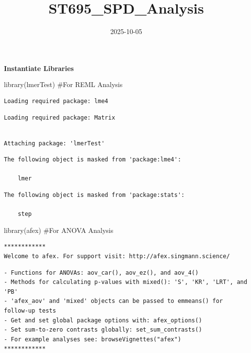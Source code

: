 \documentclass[
  letterpaper,
  DIV=11,
  numbers=noendperiod]{scrartcl}
\title{ST695\_SPD\_Analysis}
\author{}
\date{2025-10-05}
\newenvironment{Shaded}{\begin{snugshade}}{\end{snugshade}}
\newcommand{\CommentTok}[1]{\textcolor[rgb]{0.37,0.37,0.37}{#1}}
\newcommand{\FunctionTok}[1]{\textcolor[rgb]{0.28,0.35,0.67}{#1}}
\newcommand{\NormalTok}[1]{\textcolor[rgb]{0.00,0.23,0.31}{#1}}
\begin{document}
\maketitle


\textbf{Instantiate Libraries}

\begin{Shaded}
\begin{Highlighting}[]
\FunctionTok{library}\NormalTok{(lmerTest) }\CommentTok{\#For REML Analysis}
\end{Highlighting}
\end{Shaded}

\begin{verbatim}
Loading required package: lme4
\end{verbatim}

\begin{verbatim}
Loading required package: Matrix
\end{verbatim}

\begin{verbatim}

Attaching package: 'lmerTest'
\end{verbatim}

\begin{verbatim}
The following object is masked from 'package:lme4':

    lmer
\end{verbatim}

\begin{verbatim}
The following object is masked from 'package:stats':

    step
\end{verbatim}

\begin{Shaded}
\begin{Highlighting}[]
\FunctionTok{library}\NormalTok{(afex) }\CommentTok{\#For ANOVA Analysis}
\end{Highlighting}
\end{Shaded}

\begin{verbatim}
************
Welcome to afex. For support visit: http://afex.singmann.science/
\end{verbatim}

\begin{verbatim}
- Functions for ANOVAs: aov_car(), aov_ez(), and aov_4()
- Methods for calculating p-values with mixed(): 'S', 'KR', 'LRT', and 'PB'
- 'afex_aov' and 'mixed' objects can be passed to emmeans() for follow-up tests
- Get and set global package options with: afex_options()
- Set sum-to-zero contrasts globally: set_sum_contrasts()
- For example analyses see: browseVignettes("afex")
************
\end{verbatim}
\end{document}
